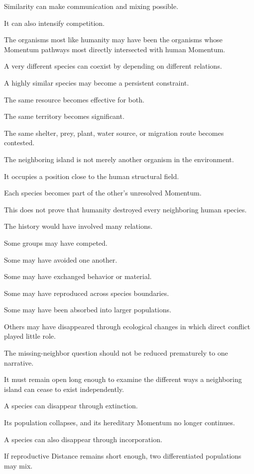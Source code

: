 Similarity can make communication and mixing possible.

It can also intensify competition.

The organisms most like humanity may have been the organisms whose Momentum pathways most directly intersected with human Momentum.

A very different species can coexist by depending on different relations.

A highly similar species may become a persistent constraint.

The same resource becomes effective for both.

The same territory becomes significant.

The same shelter, prey, plant, water source, or migration route becomes contested.

The neighboring island is not merely another organism in the environment.

It occupies a position close to the human structural field.

Each species becomes part of the other’s unresolved Momentum.

This does not prove that humanity destroyed every neighboring human species.

The history would have involved many relations.

Some groups may have competed.

Some may have avoided one another.

Some may have exchanged behavior or material.

Some may have reproduced across species boundaries.

Some may have been absorbed into larger populations.

Others may have disappeared through ecological changes in which direct conflict played little role.

The missing-neighbor question should not be reduced prematurely to one narrative.

It must remain open long enough to examine the different ways a neighboring island can cease to exist independently.

A species can disappear through extinction.

Its population collapses, and its hereditary Momentum no longer continues.

A species can also disappear through incorporation.

If reproductive Distance remains short enough, two differentiated populations may mix.

